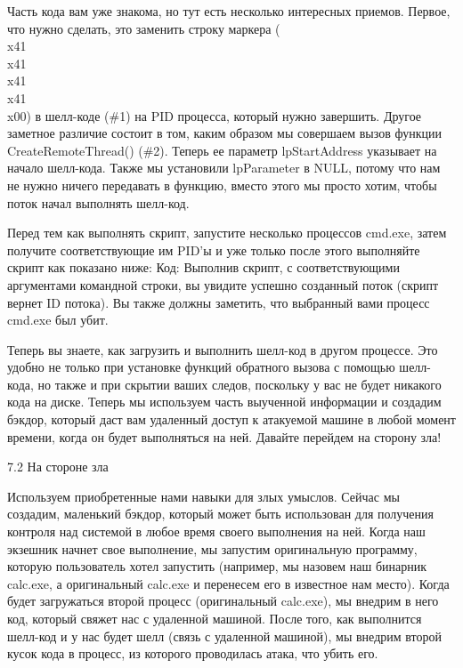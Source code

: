 \documentclass[12pt]{book}
\begin{document}
Часть кода вам уже знакома, но тут есть несколько интересных приемов. Первое, что нужно сделать, это заменить строку маркера (\\x41\\x41\\x41\\x41\\x00) в шелл-коде (\#1) на PID процесса, который нужно завершить. Другое заметное различие состоит в том, каким образом мы совершаем вызов функции CreateRemoteThread() (\#2). Теперь ее параметр lpStartAddress указывает на начало шелл-кода. Также мы установили lpParameter в NULL, потому что нам не нужно ничего передавать в функцию, вместо этого мы просто хотим, чтобы поток начал выполнять шелл-код.

Перед тем как выполнять скрипт, запустите несколько процессов cmd.exe, затем получите соответствующие им PID’ы и уже только после этого выполняйте скрипт как показано ниже:
Код:
Выполнив скрипт, с соответствующими аргументами командной строки, вы увидите успешно созданный поток (скрипт вернет ID потока). Вы также должны заметить, что выбранный вами процесс cmd.exe был убит.

Теперь вы знаете, как загрузить и выполнить шелл-код в другом процессе. Это удобно не только при установке функций обратного вызова с помощью шелл-кода, но также и при скрытии ваших следов, поскольку у вас не будет никакого кода на диске. Теперь мы используем часть выученной информации и создадим бэкдор, который даст вам удаленный доступ к атакуемой машине в любой момент времени, когда он будет выполняться на ней. Давайте перейдем на сторону зла!


7.2 На стороне зла

Используем приобретенные нами навыки для злых умыслов. Сейчас мы создадим, маленький бэкдор, который может быть использован для получения контроля над системой в любое время своего выполнения на ней. Когда наш экзешник начнет свое выполнение, мы запустим оригинальную программу, которую пользователь хотел запустить (например, мы назовем наш бинарник calc.exe, а оригинальный calc.exe и перенесем его в известное нам место). Когда будет загружаться второй процесс (оригинальный calc.exe), мы внедрим в него код, который свяжет нас с удаленной машиной. После того, как выполнится шелл-код и у нас будет шелл (связь с удаленной машиной), мы внедрим второй кусок кода в процесс, из которого проводилась атака, что убить его. 
\end{document}
